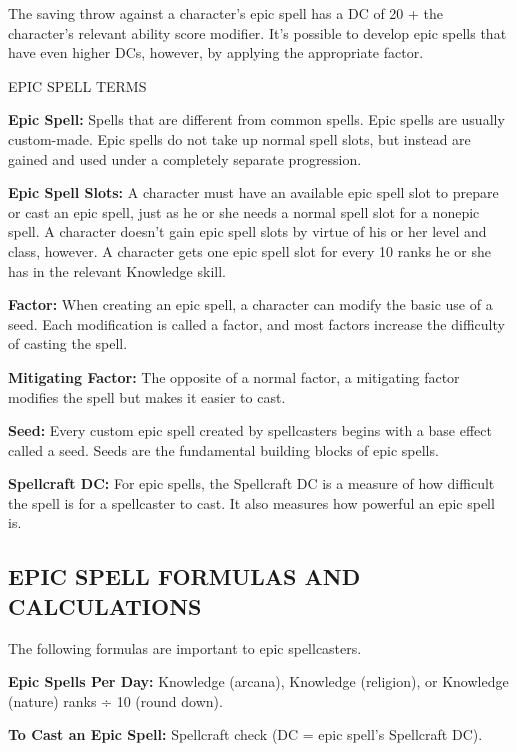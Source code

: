 \documentclass{article}
\begin{document}
The saving throw against a character's epic spell has a DC of 20 + the character's 
relevant ability score modifier. It's possible to develop epic spells that have 
even higher DCs, however, by applying the appropriate factor. 

\vspace{12pt}
EPIC SPELL TERMS

\textbf{Epic Spell: }Spells that are different from common spells. Epic spells 
are usually custom-made. Epic spells do not take up normal spell slots, but instead 
are gained and used under a completely separate progression. 

\textbf{Epic Spell Slots: }A character must have an available epic spell slot to 
prepare or cast an epic spell, just as he or she needs a normal spell slot for 
a nonepic spell. A character doesn't gain epic spell slots by virtue of his or 
her level and class, however. A character gets one epic spell slot for every 10 
ranks he or she has in the relevant Knowledge skill. 

\textbf{Factor: }When creating an epic spell, a character can modify the basic 
use of a seed. Each modification is called a factor, and most factors increase 
the difficulty of casting the spell. 

\textbf{Mitigating Factor: }The opposite of a normal factor, a mitigating factor 
modifies the spell but makes it easier to cast. 

\textbf{Seed: }Every custom epic spell created by spellcasters begins with a base 
effect called a seed. Seeds are the fundamental building blocks of epic spells. 

\textbf{Spellcraft DC: }For epic spells, the Spellcraft DC is a measure of how 
difficult the spell is for a spellcaster to cast. It also measures how powerful 
an epic spell is. 

\vspace{12pt}
\subsection*{EPIC SPELL FORMULAS AND CALCULATIONS }

The following formulas are important to epic spellcasters. 

\textbf{Epic Spells Per Day: }Knowledge (arcana), Knowledge (religion), or Knowledge 
(nature) ranks ÷ 10 (round down). 

\textbf{To Cast an Epic Spell: }Spellcraft check (DC = epic spell's Spellcraft 
DC). 
\end{document}
